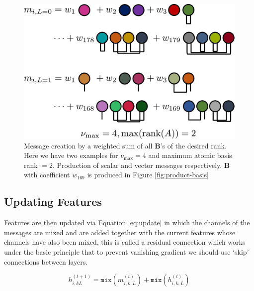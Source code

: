 \begin{figure}[H]
    \centering
    \includegraphics[scale=0.3]{figures/create-message.png}
    \caption{Message creation by a weighted sum of all $\mathbf B$'s of the desired rank. Here we have two examples for $\nu_\text{max}=4$ and maximum atomic basis rank $=2$. Production of scalar and vector messages respectively. $\mathbf B$ with coefficient $w_{169}$ is produced in Figure \ref{fig:product-basis}}
    \label{fig:create-message}
\end{figure}


\subsection{Updating Features} 
Features are then updated via Equation \ref{eq:update} in which the channels of the messages are mixed and are added together with the current features whose channels have also been mixed, this is called a residual connection \cite{he2016deep} which works under the basic principle that to prevent vanishing gradient we should use `skip' connections between layers.  

\begin{equation} \label{eq:update}
    h^{(t+1)}_{i,k L} = \texttt{mix}(m^{(t)}_{i,k, L})
    + \texttt{mix}(h^{(t)}_{i,k,L})
\end{equation}




